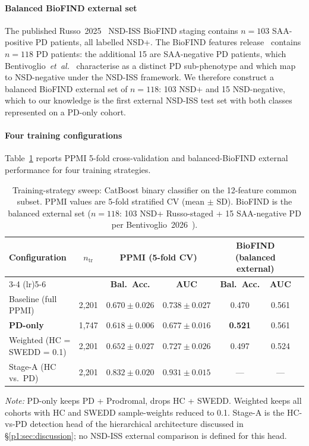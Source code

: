 \paragraph*{Balanced BioFIND external set} The published Russo~2025~\cite{russo2025} NSD-ISS BioFIND staging contains $n{=}103$ SAA-positive PD patients, all labelled NSD+. The BioFIND features release~\cite{biofind2025nsd} contains $n{=}118$ PD patients: the additional 15 are SAA-negative PD patients, which Bentivoglio~\textit{et~al.}~\cite{bentivoglio2026saaneg} characterise as a distinct PD sub-phenotype and which map to NSD-negative under the NSD-ISS framework. We therefore construct a balanced BioFIND external set of $n{=}118$: 103 NSD+ and 15 NSD-negative, which to our knowledge is the first external NSD-ISS test set with both classes represented on a PD-only cohort.

\paragraph*{Four training configurations} Table~\ref{p1:tab:pdonly} reports PPMI 5-fold cross-validation and balanced-BioFIND external performance for four training strategies.

\begin{table}[!t]
\caption{Training-strategy sweep: CatBoost binary classifier on the 12-feature common subset. PPMI values are 5-fold stratified CV (mean $\pm$ SD). BioFIND is the balanced external set ($n{=}118$: 103 NSD+ Russo-staged + 15 SAA-negative PD per Bentivoglio~2026~\cite{bentivoglio2026saaneg}).}
\label{p1:tab:pdonly}
\centering
\footnotesize
\setlength{\tabcolsep}{6pt}
\begin{tabular}{@{}lcccccc@{}}
\toprule
\textbf{Configuration} & \textbf{$n_{\mathrm{tr}}$} & \multicolumn{2}{c}{\textbf{PPMI (5-fold CV)}} & \multicolumn{2}{c}{\textbf{BioFIND (balanced external)}} \\
\cmidrule(lr){3-4} \cmidrule(lr){5-6}
 & & \textbf{Bal.\ Acc.} & \textbf{AUC} & \textbf{Bal.\ Acc.} & \textbf{AUC} \\
\midrule
Baseline (full PPMI)        & 2{,}201 & $0.670 \pm 0.026$          & $0.738 \pm 0.027$          & 0.470          & 0.561 \\
\textbf{PD-only}            & 1{,}747 & $0.618 \pm 0.006$          & $0.677 \pm 0.016$          & \textbf{0.521} & 0.561 \\
Weighted (HC = SWEDD = 0.1) & 2{,}201 & $0.652 \pm 0.027$          & $0.727 \pm 0.026$          & 0.497          & 0.524 \\
\midrule
Stage-A (HC vs.\ PD)        & 2{,}201 & $\mathbf{0.832 \pm 0.020}$ & $\mathbf{0.931 \pm 0.015}$ & ---            & ---   \\
\bottomrule
\end{tabular}
\vspace{2pt}

\raggedright\scriptsize\textit{Note:} PD-only keeps PD + Prodromal, drops HC + SWEDD. Weighted keeps all cohorts with HC and SWEDD sample-weights reduced to 0.1. Stage-A is the HC-vs-PD detection head of the hierarchical architecture discussed in \S\ref{p1:sec:discussion}; no NSD-ISS external comparison is defined for this head.
\end{table}

